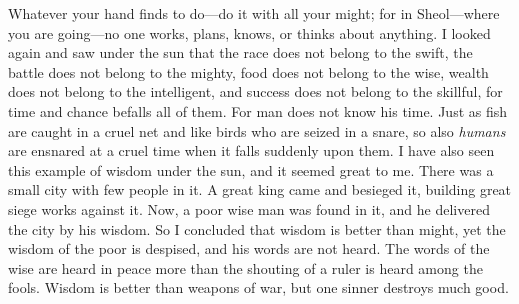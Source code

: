 \begin{biblechapter}
\verse Whatever your hand finds to do—do it with all your might; for in Sheol—where you are going—no one works, plans, knows, or thinks about anything.
 I looked again and saw under the sun that the race does not belong to the swift, the battle does not belong to the mighty, food does not belong to the wise, wealth does not belong to the intelligent, and success does not belong to the skillful, for time and chance befalls all of them.
\verse For man does not know his time. Just as fish are caught in a cruel net and like birds who are seized in a snare, so also \textit{humans} are ensnared at a cruel time when it falls suddenly upon them.
 I have also seen this example of wisdom under the sun, and it seemed great to me.
\verse There was a small city with few people in it. A great king came and besieged it, building great siege works against it.
\verse Now, a poor wise man was found in it, and he delivered the city by his wisdom.
\verse So I concluded that wisdom is better than might, yet the wisdom of the poor is despised, and his words are not heard.
 The words of the wise are heard in peace 
more than the shouting of a ruler is heard among the fools.
\verse Wisdom is better than weapons of war, 
but one sinner destroys much good.
\end{biblechapter}

